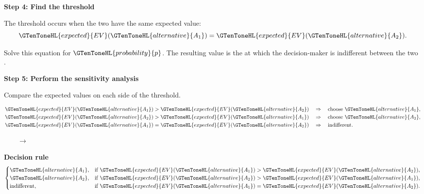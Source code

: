 	\setlength{\columnseprule}{0pt}
	
	\textbf{Step 4: Find the threshold }
	
	The threshold occurs when the two  have the same expected
	value:
	$$
	\GTenToneHL{expected}{EV}(\GTenToneHL{alternative}{A_1})=\GTenToneHL{expected}{EV}(\GTenToneHL{alternative}{A_2}).
	$$
	
	Solve this equation for $\GTenToneHL{probability}{p}$. The resulting value is the  at
	which the decision-maker is indifferent between the two .
	
	\textbf{Step 5: Perform the sensitivity analysis}
	
	Compare the expected values on each side of the threshold.
	
	\begin{center}
		\begin{minipage}{0.4\textwidth}
			\[
			\begin{aligned}
				\GTenToneHL{expected}{EV}(\GTenToneHL{alternative}{A_1})>\GTenToneHL{expected}{EV}(\GTenToneHL{alternative}{A_2}) &\quad\Rightarrow\quad \text{choose } \GTenToneHL{alternative}{A_1},\\
				\GTenToneHL{expected}{EV}(\GTenToneHL{alternative}{A_2})>\GTenToneHL{expected}{EV}(\GTenToneHL{alternative}{A_1}) &\quad\Rightarrow\quad \text{choose } \GTenToneHL{alternative}{A_2},\\
				\GTenToneHL{expected}{EV}(\GTenToneHL{alternative}{A_1})=\GTenToneHL{expected}{EV}(\GTenToneHL{alternative}{A_2}) &\quad\Rightarrow\quad \text{indifferent}.
			\end{aligned}
			\]
		\end{minipage}
		$ \qquad \longrightarrow \qquad$
		\begin{minipage}{0.4\textwidth}
			\textbf{Decision rule}
			\[
			\begin{cases}
				\GTenToneHL{alternative}{A_1}, & \text{if } \GTenToneHL{expected}{EV}(\GTenToneHL{alternative}{A_1})>\GTenToneHL{expected}{EV}(\GTenToneHL{alternative}{A_2}),\\
				\GTenToneHL{alternative}{A_2}, & \text{if } \GTenToneHL{expected}{EV}(\GTenToneHL{alternative}{A_2})>\GTenToneHL{expected}{EV}(\GTenToneHL{alternative}{A_1}),\\
				\text{indifferent}, & \text{if } \GTenToneHL{expected}{EV}(\GTenToneHL{alternative}{A_1})=\GTenToneHL{expected}{EV}(\GTenToneHL{alternative}{A_2}).
			\end{cases}
			\]
		\end{minipage}
	\end{center}
	
